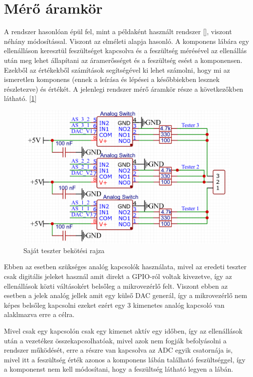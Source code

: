 \section{Mérő áramkör}

A rendszer hasonlóan épül fel, mint a példaként használt rendszer [\cite{similarSystem}], viszont néhány módosítással.
Viszont az elméleti alapja hasonló. A komponens lábára egy ellenálláson keresztül feszültséget kapcsolva és a 
feszültség mérésével az ellenállás után meg lehet állapítani az áramerősséget és a feszültség esést a komponensen.
Ezekből az értékekből számítások segítségével ki lehet számolni, hogy mi az ismeretlen komponens (ennek a leírása
és lépései a későbbiekben lesznek részletezve) és értékét. A jelenlegi rendszer mérő áramkör része a következőkben
látható. [\ref{fig:ownTesterConnection}]

\begin{figure}[h]
    \centering
    \includegraphics[scale=0.3]{figures/images/literature/TeszterConnections.png}
    \caption{Saját teszter bekötési rajza}
    \label{fig:ownTesterConnection}
\end{figure}

Ebben az esetben szükséges analóg kapcsolók használata, mivel az eredeti
teszter csak digitális jeleket használ amit direkt a GPIO-ról voltak kivezetve,
így az ellenállások közti váltásokért belsőleg a mikrovezérlő felt. Viszont ebben
az esetben a jelek analóg jellek amit egy külső DAC generál, így a mikrovezérlő nem
képes belsőleg kapcsolni ezeket ezért egy 3 kimenetes analóg kapcsoló van alaklmazva
erre a célra.

Mivel csak egy kapcsolón csak egy kimenet aktív egy időben, így az ellenállások után
a vezetékez összekapcsolhatóak, mivel azok nem fogják befolyásolni a rendszer működését,
erre a részre van kapcsolva az ADC egyik csatornája is, mivel itt a feszültség érték
azonos a komponens lábán található feszültséggel, így a komponenst nem kell módosítani,
hogy a feszültség látható legyen a lábán.

